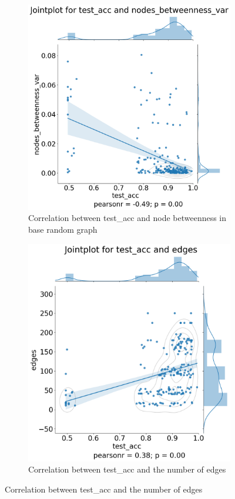 \begin{figure}[H]
    \bigskip
    \begin{subfigure}{0.45\textwidth}
        \includegraphics[width=\linewidth]{images/results/random/tanh/jointplot_test_acc_nodes_betweenness_var.png}
        \caption{Correlation between test\_acc and node betweenness in base random graph} \label{fig:jp_tanh_between}
    \end{subfigure}
    \hfill
    \begin{subfigure}{0.45\textwidth}
        \includegraphics[width=\linewidth]{images/results/random/tanh/jointplot_test_acc_edges.png}
        \caption{Correlation between test\_acc and the number of edges} \label{fig:jp_tanh_edge}
    \end{subfigure}%
    


\end{figure}
